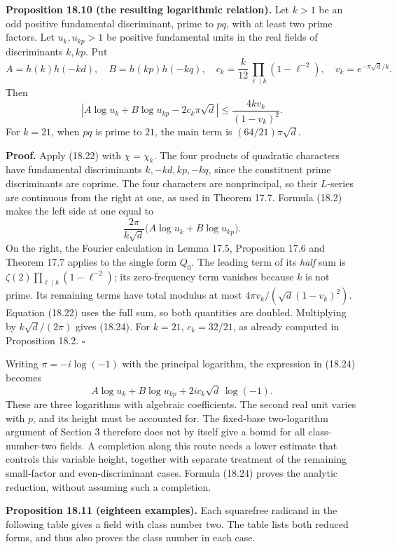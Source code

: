 \documentclass[
  11pt,
  a4paper,
]{article}
\begin{document}
\textbf{Proposition 18.10 (the resulting logarithmic relation).} Let
\(k>1\) be an odd positive fundamental discriminant, prime to \(pq\),
with at least two prime factors. Let \(u_k,u_{kp}>1\) be positive
fundamental units in the real fields of discriminants \(k,kp\). Put \[
 A=h(k)h(-kd),\quad B=h(kp)h(-kq),\quad
 c_k=\frac{k}{12}\prod_{\ell\mid k}(1-\ell^{-2}),\quad
 v_k=e^{-\pi\sqrt d/k}.
 \tag{18.23}
\] Then \[
 \left|A\log u_k+B\log u_{kp}-2c_k\pi\sqrt d\right|
 \le \frac{4kv_k}{(1-v_k)^2}.
 \tag{18.24}
\] For \(k=21\), when \(pq\) is prime to \(21\), the main term is
\((64/21)\pi\sqrt d\).

\textbf{Proof.} Apply (18.22) with \(\chi=\chi_k\). The four products of
quadratic characters have fundamental discriminants \(k,-kd,kp,-kq\),
since the constituent prime discriminants are coprime. The four
characters are nonprincipal, so their \(L\)-series are continuous from
the right at one, as used in Theorem 17.7. Formula (18.2) makes the left
side at one equal to \[
 \frac{2\pi}{k\sqrt d}
       \bigl(A\log u_k+B\log u_{kp}\bigr).
 \tag{18.25}
\] On the right, the Fourier calculation in Lemma 17.5, Proposition 17.6
and Theorem 17.7 applies to the single form \(Q_0\). The leading term of
its \emph{half} sum is \(\zeta(2)\prod_{\ell\mid k}(1-\ell^{-2})\); its
zero-frequency term vanishes because \(k\) is not prime. Its remaining
terms have total modulus at most \(4\pi v_k/(\sqrt d(1-v_k)^2)\).
Equation (18.22) uses the full sum, so both quantities are doubled.
Multiplying by \(k\sqrt d/(2\pi)\) gives (18.24). For \(k=21\),
\(c_k=32/21\), as already computed in Proposition 18.2. \(\square\)

Writing \(\pi=-i\log(-1)\) with the principal logarithm, the expression
in (18.24) becomes \[
 A\log u_k+B\log u_{kp}
       +2ic_k\sqrt d\,\log(-1).
 \tag{18.26}
\] These are three logarithms with algebraic coefficients. The second
real unit varies with \(p\), and its height must be accounted for. The
fixed-base two-logarithm argument of Section 3 therefore does not by
itself give a bound for all class-number-two fields. A completion along
this route needs a lower estimate that controls this variable height,
together with separate treatment of the remaining small-factor and
even-discriminant cases. Formula (18.24) proves the analytic reduction,
without assuming such a completion.

\textbf{Proposition 18.11 (eighteen examples).} Each squarefree radicand
in the following table gives a field with class number two. The table
lists both reduced forms, and thus also proves the class number in each
case.
\end{document}
